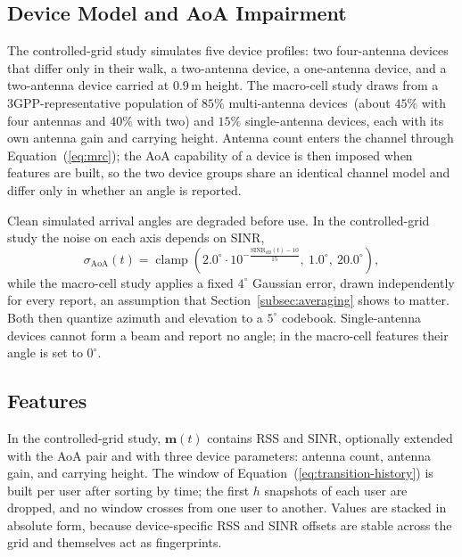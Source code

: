 \subsection{Device Model and AoA Impairment}
\label{subsec:device-model}

The controlled-grid study simulates five device profiles: two four-antenna devices that differ only in their walk, a two-antenna device, a one-antenna device, and a two-antenna device carried at $0.9\,\text{m}$ height. The macro-cell study draws from a 3GPP-representative population of $85\%$ multi-antenna devices~(about $45\%$ with four antennas and $40\%$ with two) and $15\%$ single-antenna devices, each with its own antenna gain and carrying height. %
Antenna count enters the channel through Equation~(\ref{eq:mrc}); the AoA capability of a device is then imposed when features are built, so the two device groups share an identical channel model and differ only in whether an angle is reported.

Clean simulated arrival angles are degraded before use. In the controlled-grid study the noise on each axis depends on SINR,
\begin{equation}
  \sigma_{\text{AoA}}(t) = \operatorname{clamp}\!\left(2.0^\circ \cdot 10^{-\frac{\mathrm{SINR}_{dB}(t)-10}{15}},\ 1.0^\circ,\ 20.0^\circ\right),
  \label{eq:aoa-noise}
\end{equation}
while the macro-cell study applies a fixed $4^\circ$ Gaussian error, drawn independently for every report, an assumption that Section~\ref{subsec:averaging} shows to matter. Both then quantize azimuth and elevation to a $5^\circ$ codebook. Single-antenna devices cannot form a beam and report no angle; in the macro-cell features their angle is set to $0^\circ$.

\subsection{Features}
\label{subsec:features}

In the controlled-grid study, $\mathbf{m}(t)$ contains RSS and SINR, optionally extended with the AoA pair and with three device parameters: antenna count, antenna gain, and carrying height. The window of Equation~(\ref{eq:transition-history}) is built per user after sorting by time; the first $h$ snapshots of each user are dropped, and no window crosses from one user to another. Values are stacked in absolute form, because device-specific RSS and SINR offsets are stable across the grid and themselves act as fingerprints.

